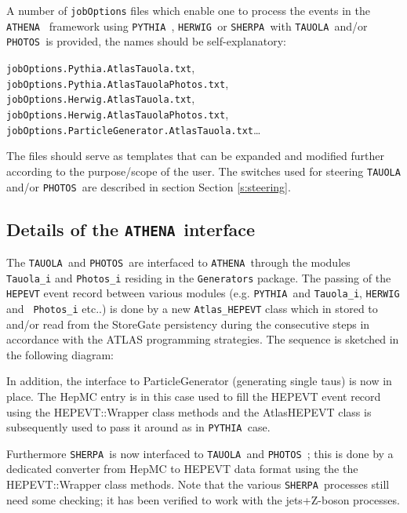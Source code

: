 \documentclass[a4paper,12pt]{article}
\newcommand{\athena}{{\tt ATHENA }}
\newcommand{\pythia}{{\tt PYTHIA }}
\newcommand{\herwig}{{\tt HERWIG }}
\newcommand{\tauola}{{\tt TAUOLA }}
\newcommand{\photos}{{\tt PHOTOS }}
\newcommand{\sherpa}{{\tt SHERPA }}
\begin{document}
A number of {\tt jobOptions} files which enable one to process the events in the \athena
framework using \pythia, \herwig or \sherpa  with \tauola and/or \photos is provided, the names
should be self-explanatory:
\begin{center}
{\tt jobOptions.Pythia.AtlasTauola.txt},
{\tt jobOptions.Pythia.AtlasTauolaPhotos.txt},\\
{\tt jobOptions.Herwig.AtlasTauola.txt},
{\tt jobOptions.Herwig.AtlasTauolaPhotos.txt},\\
{\tt jobOptions.ParticleGenerator.AtlasTauola.txt}\ldots

\end{center}

The files should serve as templates that can be expanded and modified
further according to the purpose/scope of the user. The switches used
for steering \tauola and/or
\photos are described in section  Section \ref{s:steering}.

\boldmath 
\subsection{Details of the \athena interface}
\unboldmath

The \tauola and \photos are interfaced to \athena through the modules {\tt
Tauola\_i} and {\tt Photos\_i} residing in the {\tt Generators} package. 
The passing of the {\tt HEPEVT} event record
between various modules (e.g. \pythia and {\tt Tauola\_i}, \herwig and {\tt
Photos\_i} etc..) is done by a new {\tt Atlas\_HEPEVT} class which in stored
to and/or read from the StoreGate persistency during the consecutive steps in
accordance with the ATLAS programming strategies. The sequence is sketched in
the following diagram:

\begin{center}
\end{center}

In addition, the interface to ParticleGenerator (generating single taus) is now in place.
The HepMC entry is in this case used to fill the HEPEVT event record using the HEPEVT::Wrapper
class methods and the AtlasHEPEVT class is subsequently used to pass it around as in \pythia case. 

Furthermore \sherpa is now interfaced to \tauola and \photos; this is done by a dedicated 
converter from HepMC to HEPEVT data format using the the HEPEVT::Wrapper
class methods. Note that the various \sherpa processes still need some checking; it has been verified to work with the jets+Z-boson processes.
\end{document}

